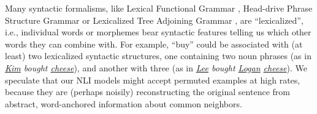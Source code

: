 \documentclass[letterpaper, 12pt]{report}
\newcommand{\PermAcc}{Permutation Acceptance} %
\begin{document}





Many syntactic formalisms, like Lexical Functional Grammar \citep[LFG]{kaplan-bresnan-1995-formal, bresnan-etal-2015-lexical}, Head-drive Phrase Structure Grammar \citep[HPSG]{pollard-sag-1994-head} or Lexicalized Tree Adjoining Grammar \citep[LTAG]{schabes-etal-1988-parsing, abeille-1990-lexical}, are ``lexicalized'', i.e., individual words or morphemes bear syntactic features telling us which other words they can combine with. For example, ``buy'' could be associated with (at least) two lexicalized syntactic structures, one containing two noun phrases (as in \textit{\underline{Kim} bought \underline{cheese}}), and another with three (as in \textit{\underline{Lee} bought \underline{Logan} \underline{cheese}}). %
We speculate that our NLI models might accept permuted examples at high rates, %
because they are (perhaps noisily) reconstructing the original sentence from abstract, word-anchored information about common neighbors.
\end{document}
